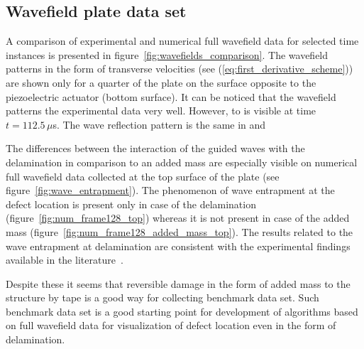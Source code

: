 \subsection{Wavefield plate data set }
A comparison of experimental and numerical full wavefield data for selected time instances is presented in figure~\ref{fig:wavefields_comparison}. The wavefield patterns in the form of transverse velocities (see (\ref{eq:first_derivative_scheme})) are shown only for a  quarter of the plate  on the surface opposite to the piezoelectric actuator (bottom surface). It can be noticed that  the wavefield patterns   the experimental data very well. However,   to   is   visible  at  time  \(t=112.5\, \mu\)s. The  wave reflection pattern is  the same in   and  

The differences between the interaction of the guided waves with the delamination in comparison to an added mass are especially visible on numerical full wavefield data collected at the top surface of the plate (see figure~\ref{fig:wave_entrapment}). The phenomenon of wave entrapment at the defect location is present only in case of the delamination (figure~\ref{fig:num_frame128_top}) whereas it is not present in case of the added mass (figure~\ref{fig:num_frame128_added_mass_top}). The results related to the wave entrapment at delamination are consistent with the experimental findings available in the literature~\cite{Glushkov2012}. 

Despite these   it seems that reversible damage in the form of added mass   to the structure by   tape is a good way for collecting benchmark data set. Such benchmark data set is a good starting point for  development of algorithms based on full wavefield data for visualization of defect location even in the form of delamination.


